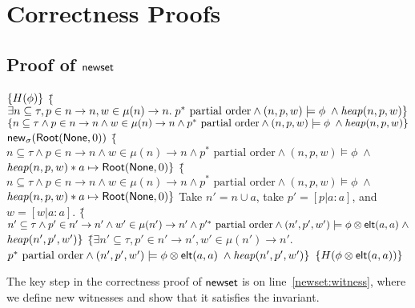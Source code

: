\section{Correctness Proofs}

\subsection{Proof of $\mathsf{newset}$}

\begin{specification}
\nextline
  $\{{H(\phi)}\}$ 
\nextline 
  $\{$\=$\exists n \subseteq \tau, p \in n \to n, w \in \mu(n) \to n.\;
      p^{*} \mbox{ partial order} \land 
             (n, p, w) \models \phi \;\land \mathit{heap}(n, p, w) \}$
\nextline 
  $\{n \subseteq \tau \land p \in n \to n \land w \in \mu(n) \to n \land
      p^{*} \mbox{ partial order} \land 
             (n, p, w) \models \phi \;\land \mathit{heap}(n, p, w) \}$
\nextline
  $\mathsf{new}_{\sigma}(\mathsf{Root}(\mathsf{None}, 0))$ 
\nextline
  $\{$\=$n \subseteq \tau \land p \in n \to n \land w \in \mu(n) \to n \land
      p^{*} \mbox{ partial order} \land 
             (n, p, w) \models \phi \;\land$
\nextline \>
        $\mathit{heap}(n, p, w) * a \mapsto \mathsf{Root}(\mathsf{None}, 0) \}$ 
\nextline
  $\{$\=$n \subseteq \tau \land p \in n \to n \land w \in \mu(n) \to n \land
      p^{*} \mbox{ partial order} \land 
             (n, p, w) \models \phi \;\land$
\nextline \>
        $\mathit{heap}(n, p, w) * a \mapsto \mathsf{Root}(\mathsf{None}, 0) \}$ 
 Take $n' = n \cup {a}$, take $p' = [p|a:a]$, and $w = [w|a:a]$. 
\nextline
  $\{$\=$n' \subseteq \tau \land p' \in n' \to n' \land w' \in \mu(n') \to n' \land
      p'^{*} \mbox{ partial order} \land 
             (n', p', w') \models \phi \otimes \mathsf{elt}({a}, {a}) \;\land$
\nextline \>
        $\mathit{heap}(n', p', w')\}$ 
\nextline 
  $\{$\=$\exists n' \subseteq \tau, p' \in n' \to n', w' \in \mu(n') \to n'.\;$ 
\nextline \>$p^{*} \mbox{ partial order} \land 
             (n', p', w') \models \phi \otimes \mathsf{elt}({a}, {a}) \;\land \mathit{heap}(n', p', w') \}$
\nextline
  $\{{H(\phi \otimes \mathsf{elt}({a}, {a}))}\}$ 

\end{specification}

The key step in the correctness proof of $\mathsf{newset}$ is on line~\ref{newset:witness}, where we define new witnesses and show that it satisfies the invariant. 

